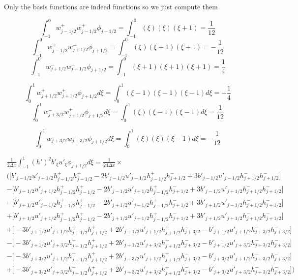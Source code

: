 \documentclass[12pt]{article}
\begin{document}
Only the basis functions are indeed functions so we just compute them

\[\int_{-1}^{0} w^+_{j-1/2}w^+_{j-1/2} \phi_{j+1/2} = \int_{-1}^{0} (\xi)(\xi) (\xi + 1) = \frac{1}{12}\]
\[\int_{-1}^{0} w^+_{j-1/2}w^-_{j+1/2} \phi_{j+1/2} = \int_{-1}^{0} (\xi)(\xi + 1) (\xi + 1) = -\frac{1}{12}\]
\[\int_{-1}^{0} w^-_{j+1/2}w^-_{j+1/2} \phi_{j+1/2} = \int_{-1}^{0} (\xi + 1)(\xi + 1) (\xi + 1) = \frac{1}{4}\]

\[\int_{0}^{1} w^+_{j+1/2}w^+_{j+1/2} \phi_{j+1/2} d\xi =\int_{0}^{1} (\xi -1)(\xi -1)(\xi - 1 ) d\xi =  - \frac{1}{4}\]
\[\int_{0}^{1} w^-_{j+3/2}w^+_{j+1/2} \phi_{j+1/2} d\xi =\int_{0}^{1} (\xi)(\xi -1)(\xi - 1 ) d\xi = \frac{1}{12}\]

\[\int_{0}^{1} w^-_{j+3/2}w^-_{j+3/2} \phi_{j+1/2} d\xi =\int_{0}^{1} (\xi)(\xi)(\xi - 1 ) d\xi = - \frac{1}{12} \]

\begin{multline}
\frac{1}{2\Delta x}\int_{-1}^{1} {(h')^2}b'_{\xi} u'_{\xi} \phi_{j+1/2} d\xi =  \frac{1}{24\Delta x} \times\\ \bigg(\bigg[b'_{j-1/2}u'_{j-1/2} h^+_{j-1/2}h^+_{j-1/2} - 2b'_{j-1/2}u'_{j-1/2}h^+_{j-1/2}h^-_{j+1/2} +3 b'_{j-1/2}u'_{j-1/2}h^-_{j+1/2}h^-_{j+1/2} \bigg] \\- \bigg[ b'_{j-1/2}u'_{j+1/2}h^+_{j-1/2}h^+_{j-1/2} - 2b'_{j-1/2}u'_{j+1/2}h^+_{j-1/2}h^-_{j+1/2} + 3b'_{j-1/2}u'_{j+1/2}h^-_{j+1/2}h^-_{j+1/2} \bigg] \\- \bigg[ b'_{j+1/2} u'_{j-1/2}h^+_{j-1/2}h^+_{j-1/2}  - 2b'_{j+1/2} u'_{j-1/2}h^+_{j-1/2}h^-_{j+1/2} +3 b'_{j+1/2} u'_{j-1/2}h^-_{j+1/2}h^-_{j+1/2} \bigg]\\+ \bigg[ b'_{j+1/2}u'_{j+1/2}h^+_{j-1/2}h^+_{j-1/2} - 2b'_{j+1/2}u'_{j+1/2}h^+_{j-1/2}h^-_{j+1/2}+ 3b'_{j+1/2}u'_{j+1/2}h^-_{j+1/2}h^-_{j+1/2} \bigg] \\
+ \bigg[-3b'_{j+1/2}u'_{j+1/2} h^+_{j+1/2}h^+_{j+1/2}+ 2b'_{j+1/2}u'_{j+1/2} h^+_{j+1/2}h^-_{j+3/2} - b'_{j+1/2}u'_{j+1/2} h^-_{j+3/2}h^-_{j+3/2} \bigg] \\- \bigg[-3b'_{j+1/2}u'_{j+3/2}h^+_{j+1/2}h^+_{j+1/2} + 2b'_{j+1/2}u'_{j+3/2}h^+_{j+1/2}h^-_{j+3/2}  - b'_{j+1/2}u'_{j+3/2}h^-_{j+3/2}h^-_{j+3/2}\bigg] \\- \bigg[-3b'_{j+3/2} u'_{j+1/2}h^+_{j+1/2}h^+_{j+1/2} + 2b'_{j+3/2} u'_{j+1/2}h^+_{j+1/2}h^-_{j+3/2}- b'_{j+3/2} u'_{j+1/2}h^-_{j+3/2}h^-_{j+3/2}\bigg] \\+ \bigg[-3b'_{j+3/2} u'_{j+3/2}h^+_{j+1/2}h^+_{j+1/2} + 2b'_{j+3/2} u'_{j+3/2}h^+_{j+1/2}h^-_{j+3/2} - b'_{j+3/2} u'_{j+3/2}h^-_{j+3/2}h^-_{j+3/2}\bigg] \bigg)
\end{multline}
\end{document}
